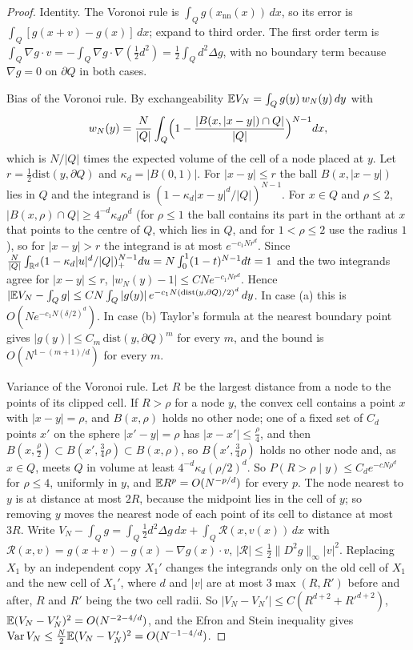 \begin{proof}
Identity. The Voronoi rule is $\int_Qg(x_{\mathrm{nn}}(x))\,dx$, so its error is $\int_Q[g(x+v)-g(x)]\,dx$; expand to third order. The first order term is $\int_Q\nabla g\cdot v=-\int_Q\nabla g\cdot\nabla(\frac12d^2)=\frac12\int_Qd^2\Delta g$, with no boundary term because $\nabla g=0$ on $\partial Q$ in both cases.

Bias of the Voronoi rule. By exchangeability $\mathbb{E} V_N=\int_Qg(y)\,w_N(y)\,dy$ with
\[
w_N(y)=\frac N{|Q|}\int_Q\Bigl(1-\frac{|B(x,|x-y|)\cap Q|}{|Q|}\Bigr)^{N-1}dx,
\]
which is $N/|Q|$ times the expected volume of the cell of a node placed at $y$. Let $r=\frac12\mathrm{dist}(y,\partial Q)$ and $\kappa_d=|B(0,1)|$. For $|x-y|\le r$ the ball $B(x,|x-y|)$ lies in $Q$ and the integrand is $(1-\kappa_d|x-y|^d/|Q|)^{N-1}$. For $x\in Q$ and $\rho\le2$, $|B(x,\rho)\cap Q|\ge4^{-d}\kappa_d\rho^d$ (for $\rho\le1$ the ball contains its part in the orthant at $x$ that points to the centre of $Q$, which lies in $Q$, and for $1<\rho\le2$ use the radius $1$), so for $|x-y|>r$ the integrand is at most $e^{-c_1Nr^d}$. Since $\frac N{|Q|}\int_{\mathbb{R}^d}(1-\kappa_d|u|^d/|Q|)_+^{N-1}du=N\int_0^1(1-t)^{N-1}dt=1$ and the two integrands agree for $|x-y|\le r$, $|w_N(y)-1|\le CNe^{-c_1Nr^d}$. Hence $|\mathbb{E} V_N-\int_Qg|\le CN\int_Q|g(y)|\,e^{-c_1N(\mathrm{dist}(y,\partial Q)/2)^d}\,dy$. In case (a) this is $O(Ne^{-c_1N(\delta/2)^d})$. In case (b) Taylor's formula at the nearest boundary point gives $|g(y)|\le C_m\,\mathrm{dist}(y,\partial Q)^m$ for every $m$, and the bound is $O(N^{1-(m+1)/d})$ for every $m$.

Variance of the Voronoi rule. Let $R$ be the largest distance from a node to the points of its clipped cell. If $R>\rho$ for a node $y$, the convex cell contains a point $x$ with $|x-y|=\rho$, and $B(x,\rho)$ holds no other node; one of a fixed set of $C_d$ points $x'$ on the sphere $|x'-y|=\rho$ has $|x-x'|\le\frac\rho4$, and then $B(x,\frac\rho2)\subset B(x',\frac34\rho)\subset B(x,\rho)$, so $B(x',\frac34\rho)$ holds no other node and, as $x\in Q$, meets $Q$ in volume at least $4^{-d}\kappa_d(\rho/2)^d$. So $P(R>\rho\mid y)\le C_de^{-cN\rho^d}$ for $\rho\le4$, uniformly in $y$, and $\mathbb{E} R^p=O(N^{-p/d})$ for every $p$. The node nearest to $y$ is at distance at most $2R$, because the midpoint lies in the cell of $y$; so removing $y$ moves the nearest node of each point of its cell to distance at most $3R$. Write $V_N-\int_Qg=\int_Q\frac12d^2\Delta g\,dx+\int_Q\mathcal R(x,v(x))\,dx$ with $\mathcal R(x,v)=g(x+v)-g(x)-\nabla g(x)\cdot v$, $|\mathcal R|\le\frac12\|D^2g\|_\infty|v|^2$. Replacing $X_1$ by an independent copy $X_1'$ changes the integrands only on the old cell of $X_1$ and the new cell of $X_1'$, where $d$ and $|v|$ are at most $3\max(R,R')$ before and after, $R$ and $R'$ being the two cell radii. So $|V_N-V_N'|\le C(R^{d+2}+R'^{d+2})$, $\mathbb{E}(V_N-V_N')^2=O(N^{-2-4/d})$, and the Efron and Stein inequality gives $\mathrm{Var}\,V_N\le\frac N2\mathbb{E}(V_N-V_N')^2=O(N^{-1-4/d})$.


\end{proof}
